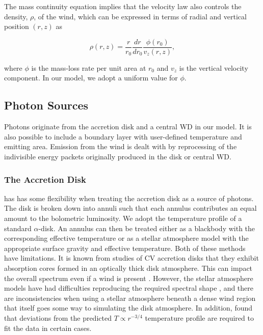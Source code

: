 \documentclass[preprint, a4paper, 11pt]{aastex}
\begin{document}
The mass continuity equation implies that the velocity law also 
controls the density, $\rho$, of the wind, which can be expressed in terms
of radial and vertical position $(r,z)$ as 

\begin{equation}
\rho(r,z) = \frac{r}{r_0} \frac{dr}{dr_0} \frac{\phi(r_0)}{v_z(r,z)},
\label{density}
\end{equation}

where $\phi$ is the mass-loss rate per unit area at $r_0$
and $v_z$ is the vertical velocity component. In our model, we
adopt a uniform value for $\phi$. 



\subsection{Photon Sources}

Photons originate from the accretion disk and a central WD in our model. It is also possible to include
a boundary layer with user-defined temperature and emitting area. Emission from the wind is dealt with
by reprocessing of the indivisible energy packets originally produced in the disk or central WD.

\subsubsection{The Accretion Disk}

\py has has some flexibility when treating the accretion disk as a source of photons. 
The disk is broken down into annuli 
such that each annulus contributes an equal amount to the bolometric luminosity. 
We adopt the temperature profile of a standard \cite{shakurasunyaev1973} $\alpha$-disk.
An annulus can then
be treated either as a blackbody with the corresponding effective temperature or as a stellar atmosphere model
with the appropriate surface gravity and effective temperature. 
Both of these methods have limitations. It is known
from studies of CV accretion disks that they exhibit absorption cores 
formed in an optically thick disk atmosphere.
This can impact the overall spectrum even if a wind is present 
\citep[see e.g.][]{dhillon1996}.
However, the stellar atmosphere models
have had difficulties reproducing the required spectral shape \citep{wade1988}, 
and there are inconsistencies when using a 
stellar atmosphere beneath a dense
wind region that itself goes some way to simulating the disk atmosphere. 
In addition, \cite{linnell2010} found that deviations from the predicted 
$T\propto r^{-3/4}$ temperature profile are required to fit the data
in certain cases. 
\end{document}

